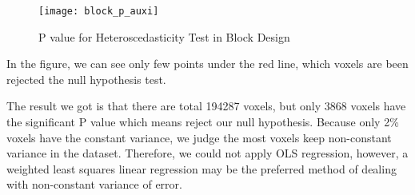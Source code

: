 \begin{figure}[!h]
\centering
\texttt{[image: block\_p\_auxi]}
\caption{P value for Heteroscedasticity Test in Block Design}
\end{figure}

In the figure, we can see only few points under the red line, which voxels are
been rejected the null hypothesis test. 

The result we got is that there are total 194287 voxels, but only 3868 voxels 
have the significant P value which means reject our null hypothesis. Because 
only 2\% voxels have the constant variance, we judge the most voxels keep 
non-constant variance in the dataset. Therefore, we could not apply OLS regression, 
however, a weighted least squares linear regression 
may be the preferred method of dealing with non-constant variance of error.

